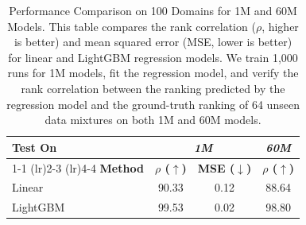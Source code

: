 \begin{table}[t]
    \centering
    \small
    \caption{Performance Comparison on 100 Domains for 1M and 60M Models. This table compares the rank correlation ($\rho$, higher is better) and mean squared error (MSE, lower is better) for linear and LightGBM regression models. 
    We train 1,000 runs for 1M models, fit the regression model, and verify the rank correlation between the ranking predicted by the regression model and the ground-truth ranking of 64 unseen data mixtures on both 1M and 60M models.}
    \label{tab:linear_vs_lightgbm_more_domains}
    \vspace{1mm}
    \begin{tabular}{lccc}
        \toprule
        {Test On} & \multicolumn{2}{c}{\textit{1M}} & {\textit{60M}}  \\
        \cmidrule(lr){1-1} \cmidrule(lr){2-3}  \cmidrule(lr){4-4}
        \textbf{Method} & \textbf{$\rho$ ($\uparrow$)} & \textbf{MSE ($\downarrow$)} & \textbf{$\rho$ ($\uparrow$)} \\
        \midrule
        Linear & 90.33 & 0.12  & 88.64  \\
        {LightGBM} & {99.53} & {0.02} & {98.80} \\
        \bottomrule
    \end{tabular}
\end{table}

